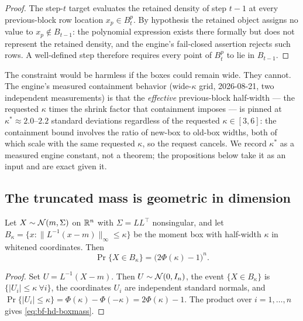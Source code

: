\begin{proof}
The step-\(t\) target evaluates the retained density of step \(t-1\) at
every previous-block row location \(x_p\in B^{p}_{t}\).  By hypothesis
the retained object assigns no value to \(x_p\notin B_{t-1}\): the
polynomial expression exists there formally but does not represent the
retained density, and the engine's fail-closed assertion rejects such
rows.  A well-defined step therefore requires every point of
\(B^{p}_{t}\) to lie in \(B_{t-1}\).
\end{proof}

The constraint would be harmless if the boxes could remain wide.  They
cannot.  The engine's measured containment behavior (wide-\(\kappa\)
grid, 2026-08-21, two independent measurements) is that the
\emph{effective} previous-block half-width --- the requested \(\kappa\)
times the shrink factor that containment imposes --- is pinned at
\(\kappa^{*}\approx 2.0\)--\(2.2\) standard deviations regardless of the
requested \(\kappa\in[3,6]\): the containment bound involves the ratio of
new-box to old-box widths, both of which scale with the same requested
\(\kappa\), so the request cancels.  We record \(\kappa^{*}\) as a
measured engine constant, not a theorem; the propositions below take it
as an input and are exact given it.

\subsection{The truncated mass is geometric in dimension}

\begin{proposition}
\label{prop:bf-hd-gaussian-box-mass}
Let \(X\sim\mathcal{N}(m,\Sigma)\) on \(\mathbb{R}^n\) with \(\Sigma=LL^{\top}\)
nonsingular, and let
\(B_\kappa=\{x:\lVert L^{-1}(x-m)\rVert_\infty\le\kappa\}\) be the
moment box with half-width \(\kappa\) in whitened coordinates.  Then
\begin{equation}
  \Pr\{X\in B_\kappa\}=\bigl(2\Phi(\kappa)-1\bigr)^{n}.
  \label{eq:bf-hd-boxmass}
\end{equation}
\end{proposition}

\begin{proof}
Set \(U=L^{-1}(X-m)\).  Then \(U\sim\mathcal{N}(0,I_n)\), the event
\(\{X\in B_\kappa\}\) is \(\{\lvert U_i\rvert\le\kappa\ \forall i\}\),
the coordinates \(U_i\) are independent standard normals, and
\(\Pr\{\lvert U_i\rvert\le\kappa\}=\Phi(\kappa)-\Phi(-\kappa)
=2\Phi(\kappa)-1\).  The product over \(i=1,\dots,n\) gives
\eqref{eq:bf-hd-boxmass}.
\end{proof}


